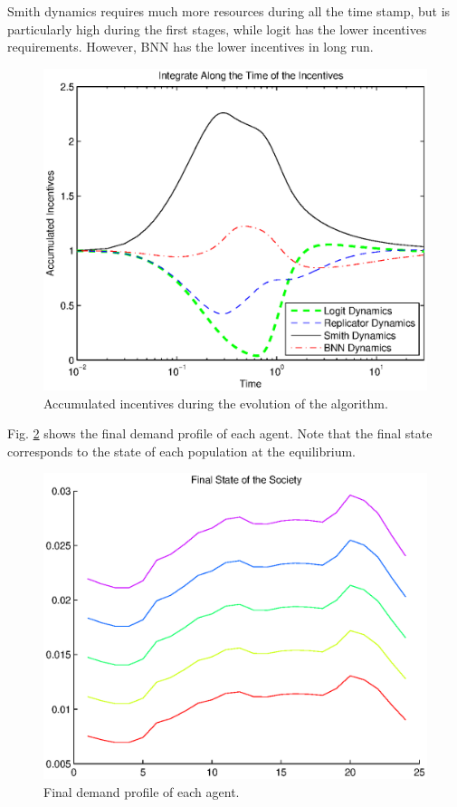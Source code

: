 \documentclass[a4paper,10pt]{article}
\begin{document}
Smith dynamics requires much more resources during all the time stamp, but is particularly high during the first stages, while logit has the lower incentives requirements. However, BNN has the lower incentives in long run.

\begin{figure}[hbt]
 \centering
 \includegraphics[width=.75\textwidth]{./images/accumulated_i.eps}
 \caption{Accumulated incentives during the evolution of the algorithm.}
 \label{fig:integral}
\end{figure}



Fig. \ref{fig:final_state} shows the final demand profile of each agent. Note that the final state corresponds to the state of each population at the equilibrium.

\begin{figure}[hbt]
 \centering
 \includegraphics[width=.75\textwidth]{./images/final_state.eps}
 \caption{Final demand profile of each agent.}
 \label{fig:final_state}
\end{figure}
\end{document}
